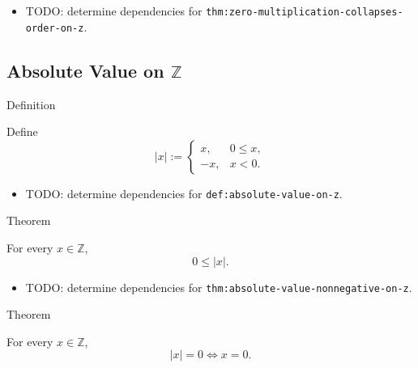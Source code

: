 \begin{dependencies}
\begin{itemize}
  \item TODO: determine dependencies for \texttt{thm:zero-multiplication-collapses-order-on-z}.
\end{itemize}
\end{dependencies}

\subsection*{Absolute Value on $\mathbb{Z}$}

\begin{definitionbox}{Definition}
\begin{definition}
\label{def:absolute-value-on-z}
Define
\[
|x|:=\begin{cases}
x, & 0\le x,\\
-x, & x<0.
\end{cases}
\]
\end{definition}
\end{definitionbox}

\begin{dependencies}
\begin{itemize}
  \item TODO: determine dependencies for \texttt{def:absolute-value-on-z}.
\end{itemize}
\end{dependencies}

\begin{theorembox}{Theorem}
\begin{theorem}
\label{thm:absolute-value-nonnegative-on-z}
For every $x\in\mathbb{Z}$,
\[
0\le |x|.
\]
\end{theorem}
\end{theorembox}

\begin{dependencies}
\begin{itemize}
  \item TODO: determine dependencies for \texttt{thm:absolute-value-nonnegative-on-z}.
\end{itemize}
\end{dependencies}

\begin{theorembox}{Theorem}
\begin{theorem}
\label{thm:absolute-value-zero-iff-on-z}
For every $x\in\mathbb{Z}$,
\[
|x|=0 \Longleftrightarrow x=0.
\]
\end{theorem}
\end{theorembox}


